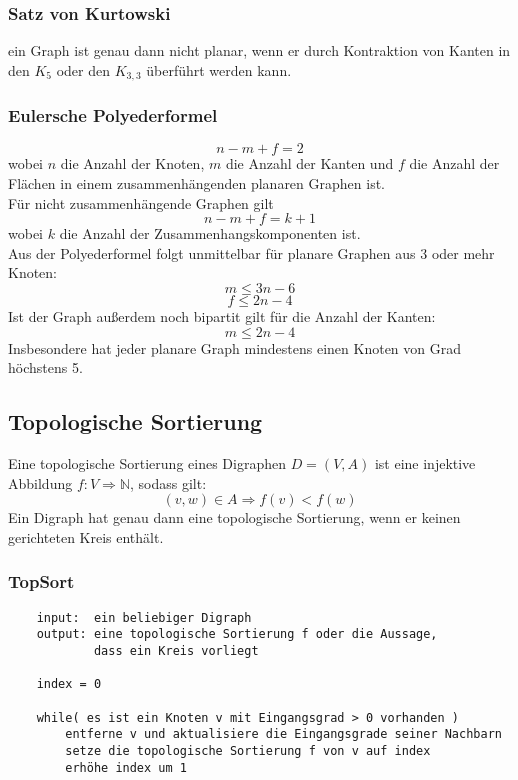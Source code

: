 \documentclass[10pt,a4paper,landscape]{article}
\begin{document}
\begin{multicols*}{2}
            \subsubsection*{ Satz von Kurtowski } ein Graph ist genau dann nicht planar, wenn er durch Kontraktion von Kanten 
            in den $K_5$ oder den $K_{3,3}$ überführt werden kann.
            \subsubsection*{ Eulersche Polyederformel }
            \[ n - m + f = 2 \]
            wobei $n$ die Anzahl der Knoten, $m$ die Anzahl der Kanten und $f$ die Anzahl der Flächen in einem 
            zusammenhängenden planaren Graphen ist. \\
            Für nicht zusammenhängende Graphen gilt
            \[ n - m + f = k + 1 \]
            wobei $k$ die Anzahl der Zusammenhangskomponenten ist. \\
            Aus der Polyederformel folgt unmittelbar für planare Graphen aus 3 oder mehr Knoten:
            \[ m \leq 3n - 6 \]
            \[ f \leq 2n - 4 \]
            Ist der Graph außerdem noch bipartit gilt für die Anzahl der Kanten:
            \[ m \leq 2n - 4 \]
            Insbesondere hat jeder planare Graph mindestens einen Knoten von Grad höchstens 5.

            \subsection{ Topologische Sortierung }
            Eine topologische Sortierung eines Digraphen $D = (V,A)$ ist eine injektive Abbildung 
            $f:V\Rightarrow \mathbb{N}$, sodass gilt:
            \[ (v,w)\in A \Rightarrow f(v) < f(w) \]
            Ein Digraph hat genau dann eine topologische Sortierung, wenn er keinen gerichteten Kreis enthält.
            \newpage
            \subsubsection*{ TopSort }
            \begin{verbatim}
    input:  ein beliebiger Digraph
    output: eine topologische Sortierung f oder die Aussage, 
            dass ein Kreis vorliegt

    index = 0

    while( es ist ein Knoten v mit Eingangsgrad > 0 vorhanden )
        entferne v und aktualisiere die Eingangsgrade seiner Nachbarn
        setze die topologische Sortierung f von v auf index
        erhöhe index um 1


\end{verbatim}
\end{multicols*}
\end{document}
